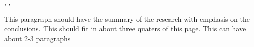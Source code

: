 \newpage

\begin{spacing}{1}

\begin{center} 
    {\expandafter\MakeUppercase{\textbf{\projectTitle}}}

    \vspace{2em}

    {\textbf{\nameWithInitials}}

    \vspace{1em}

    {\fontsize{10pt}{0pt}\selectfont
        \departmentName, \universityName, \universityCountry
    }   
\end{center}

\vspace{2em}

{This paragraph should have the summary of the research with emphasis on the conclusions. This should fit in about three quaters of this page. This can have about 2-3 paragraphs} 
 
\end{spacing}
